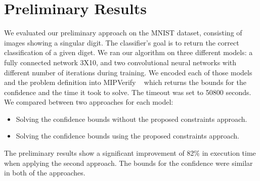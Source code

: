 
\section{Preliminary Results}
We evaluated our preliminary approach on the MNIST dataset, consisting of images showing a singular digit.
The classifier's goal is to return the correct classification of a given diget. %
We ran our algorithm on three different models: a fully connected network 3X10, and two convolutional neural networks with different number of iterations during training. We encoded each of those models and the problem definition into MIPVerify ~\cite{MIPVERIFY} which returns the bounds for the confidence and the time it took to solve. The timeout was set to 50800 seconds. We compared between two approaches for each model:
\begin{itemize}
    \item Solving the confidence bounds without the proposed constraints approach.
    \item Solving the confidence bounds using the proposed constraints approach.
\end{itemize}
The preliminary results show a significant improvement of 82\% in execution time when applying the second approach.
The bounds for the confidence were similar in both of the approaches.